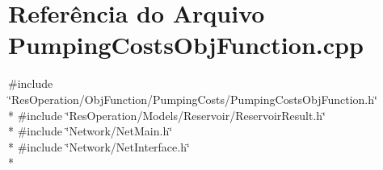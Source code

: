 \section{Referência do Arquivo Pumping\+Costs\+Obj\+Function.\+cpp}
\label{_obj_function_2_pumping_costs_2_pumping_costs_obj_function_8cpp}
{\ttfamily \#include \char`\"{}Res\+Operation/\+Obj\+Function/\+Pumping\+Costs/\+Pumping\+Costs\+Obj\+Function.\+h\char`\"{}}\\*
{\ttfamily \#include \char`\"{}Res\+Operation/\+Models/\+Reservoir/\+Reservoir\+Result.\+h\char`\"{}}\\*
{\ttfamily \#include \char`\"{}Network/\+Net\+Main.\+h\char`\"{}}\\*
{\ttfamily \#include \char`\"{}Network/\+Net\+Interface.\+h\char`\"{}}\\*
